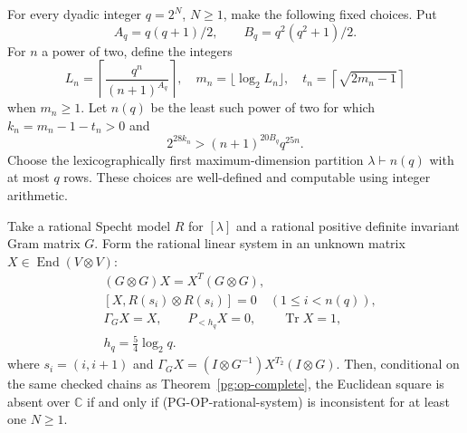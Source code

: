 \begin{corollary}
\label{pg:op-deterministic}
For every dyadic integer $q=2^N$, $N\geq1$, make the following fixed
choices. Put
\[
 A_q=q(q+1)/2,\qquad B_q=q^2(q^2+1)/2.
\]
For $n$ a power of two, define the integers
\[
 L_n=\left\lceil\frac{q^n}{(n+1)^{A_q}}\right\rceil,
 \quad m_n=\lfloor\log_2L_n\rfloor,
 \quad t_n=\left\lceil\sqrt{2m_n-1}\right\rceil
\]
when $m_n\geq1$. Let $n(q)$ be the least such power of two for which
$k_n=m_n-1-t_n>0$ and
\[
 2^{28k_n}>(n+1)^{20B_q}q^{25n}.
 \tag{PG-OP-integer-size}
\]
Choose the lexicographically first maximum-dimension partition
$\lambda\vdash n(q)$ with at most $q$ rows. These choices are
well-defined and computable using integer arithmetic.

Take a rational Specht model $R$ for $[\lambda]$ and a rational positive
definite invariant Gram matrix $G$. Form the rational linear system in
an unknown matrix $X\in\operatorname{End}(V\otimes V)$:
\[
\begin{split}
 &(G\otimes G)X=X^T(G\otimes G),\\
 &[X,R(s_i)\otimes R(s_i)]=0\quad(1\leq i<n(q)),\\
 &\Gamma_G X=X,\qquad P_{<h_q}X=0,\qquad\operatorname{Tr}X=1,\\
 &h_q=\tfrac54\log_2q.
\end{split}
 \tag{PG-OP-rational-system}
\]
where $s_i=(i,i+1)$ and
$\Gamma_GX=(I\otimes G^{-1})X^{T_2}(I\otimes G)$.
Then, conditional on the same checked chains as
Theorem~\ref{pg:op-complete}, the Euclidean square is absent over
$\mathbb C$ if and only if (PG-OP-rational-system) is inconsistent for
at least one $N\geq1$.
\end{corollary}
